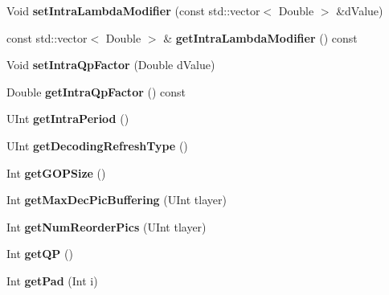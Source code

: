 \begin{DoxyCompactItemize}
\mbox{\label{class_t_enc_cfg_a1d8a0cf5d250aa8afd87a0ebcf7be8b7}} 
Void {\bfseries set\+Intra\+Lambda\+Modifier} (const std\+::vector$<$ Double $>$ \&d\+Value)
\item 
\mbox{\label{class_t_enc_cfg_a2fc522a5311bf31fe540af760a0d2d75}} 
const std\+::vector$<$ Double $>$ \& {\bfseries get\+Intra\+Lambda\+Modifier} () const
\item 
\mbox{\label{class_t_enc_cfg_a0bee4953a7bea781837b9d295c66d022}} 
Void {\bfseries set\+Intra\+Qp\+Factor} (Double d\+Value)
\item 
\mbox{\label{class_t_enc_cfg_a2df0f841ec880ddb15450b62c8335f5b}} 
Double {\bfseries get\+Intra\+Qp\+Factor} () const
\item 
\mbox{\label{class_t_enc_cfg_ae9afe1e1d511a8694897f1d446fb8ed2}} 
U\+Int {\bfseries get\+Intra\+Period} ()
\item 
\mbox{\label{class_t_enc_cfg_aa8787101b8a6ff3f0a530605c3961391}} 
U\+Int {\bfseries get\+Decoding\+Refresh\+Type} ()
\item 
\mbox{\label{class_t_enc_cfg_a68bd387990754a78ed1d20c98369c43a}} 
Int {\bfseries get\+G\+O\+P\+Size} ()
\item 
\mbox{\label{class_t_enc_cfg_a95bf92608b7ac59a10313f86238e7ecc}} 
Int {\bfseries get\+Max\+Dec\+Pic\+Buffering} (U\+Int tlayer)
\item 
\mbox{\label{class_t_enc_cfg_ab342c7417a3f388e89d25608de865282}} 
Int {\bfseries get\+Num\+Reorder\+Pics} (U\+Int tlayer)
\item 
\mbox{\label{class_t_enc_cfg_ad3b0b37a22961c87c42856d08c1e0662}} 
Int {\bfseries get\+QP} ()
\item 
\mbox{\label{class_t_enc_cfg_a4a1d909c470682f853c711f508722a5c}} 
Int {\bfseries get\+Pad} (Int i)
\item 
\mbox{\label{class_t_enc_cfg_a7d303b891ea1d7b5bff190ba5e22aabc}} 

\end{DoxyCompactItemize}
